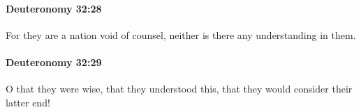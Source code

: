 		\paragraph{Deuteronomy 32:28} %
			\label{DEUTERONOMY-32-28}

			For they are a nation void of counsel, neither is there any understanding in them.


		\paragraph{Deuteronomy 32:29} %
			\label{DEUTERONOMY-32-29}

			O that they were wise, that they understood this, that they would consider their latter end!


